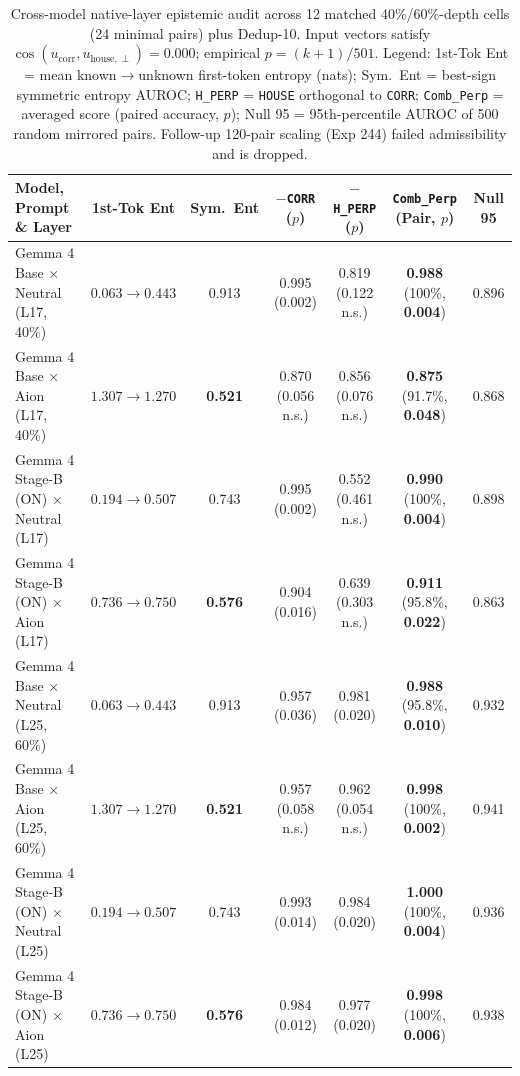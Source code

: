 \documentclass[conference]{IEEEtran}
\begin{document}
\begin{table}[t]
\centering
\caption{Cross-model native-layer epistemic audit across 12 matched 40\%/60\%-depth cells (24 minimal pairs) plus Dedup-10. Input vectors satisfy $\cos(u_{\text{corr}}, u_{\text{house},\perp})=0.000$; empirical $p=(k+1)/501$. Legend: 1st-Tok Ent = mean known$\to$unknown first-token entropy (nats); Sym.\ Ent = best-sign symmetric entropy AUROC; \texttt{H\_PERP} = \texttt{HOUSE} orthogonal to \texttt{CORR}; \texttt{Comb\_Perp} = averaged score (paired accuracy, $p$); Null 95 = 95th-percentile AUROC of 500 random mirrored pairs. Follow-up 120-pair scaling (Exp 244) failed admissibility and is dropped.}
\label{tab:epi}
\scriptsize
\setlength{\tabcolsep}{2.4pt}
\begin{tabular}{@{}lcccccc@{}}
\toprule
\textbf{Model, Prompt \& Layer} & \textbf{1st-Tok Ent} & \textbf{Sym.\ Ent} & \textbf{$-$\texttt{CORR} ($p$)} & \textbf{$-$\texttt{H\_PERP} ($p$)} & \textbf{\texttt{Comb\_Perp} (Pair, $p$)} & \textbf{Null 95} \\
\midrule
Gemma 4 Base $\times$ Neutral (L17, 40\%) & $0.063\to0.443$ & 0.913 & 0.995 (0.002) & 0.819 (0.122 n.s.) & \textbf{0.988} (100\%, \textbf{0.004}) & 0.896 \\
Gemma 4 Base $\times$ Aion (L17, 40\%) & $1.307\to1.270$ & \textbf{0.521} & 0.870 (0.056 n.s.) & 0.856 (0.076 n.s.) & \textbf{0.875} (91.7\%, \textbf{0.048}) & 0.868 \\
Gemma 4 Stage-B (ON) $\times$ Neutral (L17) & $0.194\to0.507$ & 0.743 & 0.995 (0.002) & 0.552 (0.461 n.s.) & \textbf{0.990} (100\%, \textbf{0.004}) & 0.898 \\
Gemma 4 Stage-B (ON) $\times$ Aion (L17) & $0.736\to0.750$ & \textbf{0.576} & 0.904 (0.016) & 0.639 (0.303 n.s.) & \textbf{0.911} (95.8\%, \textbf{0.022}) & 0.863 \\
\midrule
Gemma 4 Base $\times$ Neutral (L25, 60\%) & $0.063\to0.443$ & 0.913 & 0.957 (0.036) & 0.981 (0.020) & \textbf{0.988} (95.8\%, \textbf{0.010}) & 0.932 \\
Gemma 4 Base $\times$ Aion (L25, 60\%) & $1.307\to1.270$ & \textbf{0.521} & 0.957 (0.058 n.s.) & 0.962 (0.054 n.s.) & \textbf{0.998} (100\%, \textbf{0.002}) & 0.941 \\
Gemma 4 Stage-B (ON) $\times$ Neutral (L25) & $0.194\to0.507$ & 0.743 & 0.993 (0.014) & 0.984 (0.020) & \textbf{1.000} (100\%, \textbf{0.004}) & 0.936 \\
Gemma 4 Stage-B (ON) $\times$ Aion (L25) & $0.736\to0.750$ & \textbf{0.576} & 0.984 (0.012) & 0.977 (0.020) & \textbf{0.998} (100\%, \textbf{0.006}) & 0.938 \\

\end{tabular}
\end{table}
\end{document}
